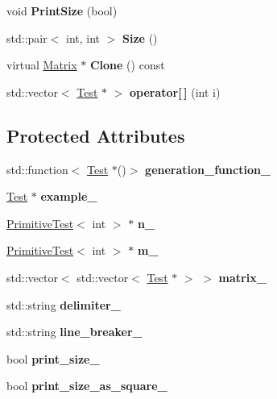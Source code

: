 \begin{DoxyCompactItemize}
void {\bfseries Print\+Size} (bool)
\item 
\mbox{\label{class_matrix_ada8820cdc7df9cb0397496f994614df9}} 
std\+::pair$<$ int, int $>$ {\bfseries Size} ()
\item 
\mbox{\label{class_matrix_a8aa21068138628b0009c8da68924b718}} 
virtual \hyperlink{class_matrix}{Matrix} $\ast$ {\bfseries Clone} () const
\item 
\mbox{\label{class_matrix_a667c01a94f1c5e6c2f3a94ae62a27b4d}} 
std\+::vector$<$ \hyperlink{class_test}{Test} $\ast$ $>$ {\bfseries operator\mbox{[}$\,$\mbox{]}} (int i)
\end{DoxyCompactItemize}
\subsection*{Protected Attributes}
\begin{DoxyCompactItemize}
\item 
\mbox{\label{class_matrix_a438f078e6bbcd0644a976c28b0ac3f30}} 
std\+::function$<$ \hyperlink{class_test}{Test} $\ast$()$>$ {\bfseries generation\+\_\+function\+\_\+}
\item 
\mbox{\label{class_matrix_a0901ceb2c484aabc0d1c3d17e7f8a486}} 
\hyperlink{class_test}{Test} $\ast$ {\bfseries example\+\_\+}
\item 
\mbox{\label{class_matrix_a3e9d1073fdbcde43ee028a6405970746}} 
\hyperlink{class_primitive_test}{Primitive\+Test}$<$ int $>$ $\ast$ {\bfseries n\+\_\+}
\item 
\mbox{\label{class_matrix_a2790a160b50a135357ae20b9fae613e6}} 
\hyperlink{class_primitive_test}{Primitive\+Test}$<$ int $>$ $\ast$ {\bfseries m\+\_\+}
\item 
\mbox{\label{class_matrix_ab03d74c673757f8163e262cd521a98ae}} 
std\+::vector$<$ std\+::vector$<$ \hyperlink{class_test}{Test} $\ast$ $>$ $>$ {\bfseries matrix\+\_\+}
\item 
\mbox{\label{class_matrix_a663fb05d113edfe4a05f326cdeb1177d}} 
std\+::string {\bfseries delimiter\+\_\+}
\item 
\mbox{\label{class_matrix_a0ea53f948bd31468c744de899eb1e662}} 
std\+::string {\bfseries line\+\_\+breaker\+\_\+}
\item 
\mbox{\label{class_matrix_a639e660065b416929aae3c37fa36fb27}} 
bool {\bfseries print\+\_\+size\+\_\+}
\item 
\mbox{\label{class_matrix_a7030785bad549a53de17ba99b9a05521}} 
bool {\bfseries print\+\_\+size\+\_\+as\+\_\+square\+\_\+}
\end{DoxyCompactItemize}



